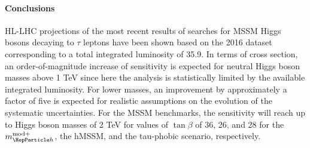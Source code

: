 \paragraph{Conclusions}
\label{sec:conclusions}
%
HL-LHC projections of the most recent results of searches for MSSM Higgs bosons decaying to $\tau$ leptons have been shown 
based on the 2016 dataset corresponding to a total integrated luminosity of 35.9\fbinv.
In terms of cross section, 
an order-of-magnitude increase of sensitivity is expected for neutral Higgs boson masses above 1 TeV since here the analysis is statistically limited by the 
available integrated luminosity. For lower masses, an improvement by approximately a factor of five is expected for realistic assumptions on the evolution of 
the systematic uncertainties. For the MSSM benchmarks, the sensitivity will reach up to Higgs boson masses of 2 TeV for values of $\tan \beta$ of 36, 26, and 28  
for the $\mhmodp$, the hMSSM, and the tau-phobic scenario, respectively.
